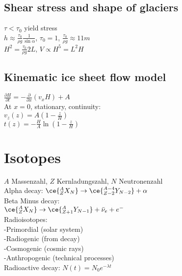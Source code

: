 \subsection*{Shear stress and shape of glaciers}
$\tau < \tau_0$ yield stress\\
$h\approx \frac{\tau_0}{\rho g}\frac{1}{\sin{\alpha}}$, $\tau_0=1$, $\frac{\tau_0}{\rho g}\approx 11m$\\
$H^2=\frac{\tau_0}{\rho g}2L$, $V\propto H^5 = L^2 H$
\subsection*{Kinematic ice sheet flow model}
$\frac{\partial H}{\partial t}=-\frac{\partial}{\partial x}(v_x H)+A$\\
At $x=0$, stationary, continuity:\\
$v_z(z)=A(1-\frac{z}{H})$\\
$t(z)=-\frac{H}{A}\ln{(1-\frac{z}{H})}$
\section*{Isotopes}
$A$ Massenzahl, $Z$ Kernladungszahl, $N$ Neutronenzahl\\
Alpha decay: $\ce{_Z^AX_N}\rightarrow \ce{_{Z-2}^{A-4}Y_{N-2}}+\alpha$\\
Beta Minus decay:\\
$\ce{_{Z}^AX_N}\rightarrow\ce{_{Z+1}^AY_{N-1}}+\bar{\nu}_e+e^-$\\
Radioisotopes:\\
-Primordial (solar system)\\
-Radiogenic (from decay)\\
-Cosmogenic (cosmic rays)\\
-Anthropogenic (technical processes)\\
Radioactive decay: $N(t)=N_0e^{-\lambda t}$

